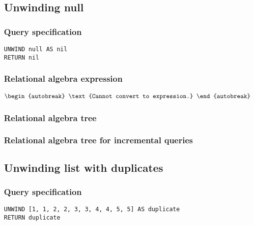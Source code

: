 
\subsection{Unwinding null}

\subsubsection*{Query specification}

\begin{lstlisting}
UNWIND null AS nil
RETURN nil
\end{lstlisting}

\subsubsection*{Relational algebra expression}

\begin{align*}
\begin{autobreak}
\text{Cannot convert to expression.}
\end{autobreak}
\end{align*}

\subsubsection*{Relational algebra tree}


\subsubsection*{Relational algebra tree for incremental queries}


\subsection{Unwinding list with duplicates}

\subsubsection*{Query specification}

\begin{lstlisting}
UNWIND [1, 1, 2, 2, 3, 3, 4, 4, 5, 5] AS duplicate
RETURN duplicate
\end{lstlisting}

